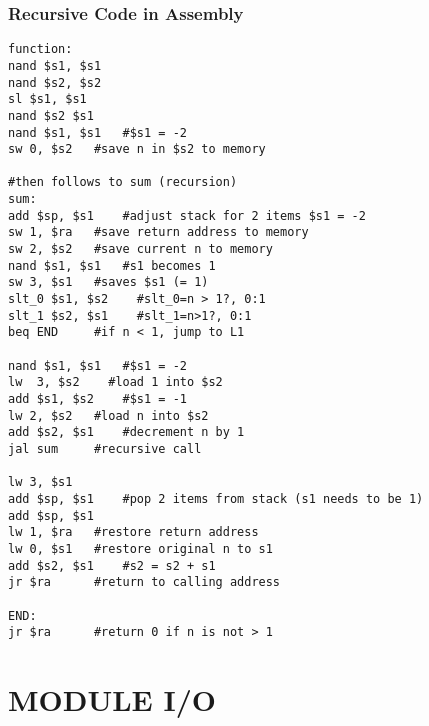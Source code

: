 \documentclass[11pt, titlepage]{article}
\begin{document}
\subsubsection{Recursive Code in Assembly}
\begin{lstlisting}[language=Ant]
function:
nand $s1, $s1
nand $s2, $s2  
sl $s1, $s1
nand $s2 $s1
nand $s1, $s1   #$s1 = -2 
sw 0, $s2   #save n in $s2 to memory

#then follows to sum (recursion)
sum:
add $sp, $s1    #adjust stack for 2 items $s1 = -2
sw 1, $ra   #save return address to memory
sw 2, $s2   #save current n to memory
nand $s1, $s1   #s1 becomes 1
sw 3, $s1   #saves $s1 (= 1)
slt_0 $s1, $s2    #slt_0=n > 1?, 0:1  
slt_1 $s2, $s1    #slt_1=n>1?, 0:1  
beq END     #if n < 1, jump to L1

nand $s1, $s1   #$s1 = -2
lw  3, $s2    #load 1 into $s2
add $s1, $s2    #$s1 = -1
lw 2, $s2   #load n into $s2
add $s2, $s1    #decrement n by 1
jal sum     #recursive call

lw 3, $s1
add $sp, $s1    #pop 2 items from stack (s1 needs to be 1)
add $sp, $s1
lw 1, $ra   #restore return address
lw 0, $s1   #restore original n to s1
add $s2, $s1    #s2 = s2 + s1
jr $ra      #return to calling address

END: 
jr $ra      #return 0 if n is not > 1
\end{lstlisting}

\section{MODULE I/O}
\end{document}
